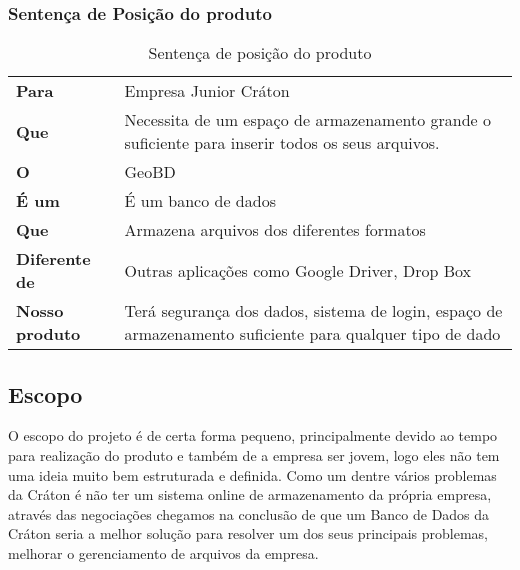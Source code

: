 \subsubsection{Sentença de Posição do produto}

  \begin{table}[!htb]
    \centering
    \begin{tabular}{p{5cm}p{8cm}} \hline
      \rowcolor{gray!50}
      \multicolumn{2}{c}{Produto}                                                                                                       \\ \hline
      \textbf{Para}           & Empresa Junior Cráton                                                                                   \\
      \textbf{Que}            & Necessita de um espaço de armazenamento grande o suficiente para inserir todos os seus arquivos.        \\
      \textbf{O}              & GeoBD                                                                                                   \\
      \textbf{É um}           & É um banco de dados                                                                                     \\
      \textbf{Que}            & Armazena arquivos dos diferentes formatos                                                               \\
      \textbf{Diferente de}   & Outras aplicações como Google Driver, Drop Box                                                          \\
      \textbf{Nosso produto}  & Terá segurança dos dados, sistema de login, espaço de armazenamento suficiente para qualquer tipo de dado
    \end{tabular}
    \caption{Sentença de posição do produto}
  \end{table}

\subsection{Escopo}

  O escopo do projeto é de certa forma pequeno, principalmente devido ao tempo para realização do produto e também de a empresa ser jovem, logo
  eles não tem uma ideia muito bem estruturada e definida. Como um dentre vários problemas da Cráton é não ter um sistema online de armazenamento
  da própria empresa, através das negociações chegamos na conclusão de que um Banco de Dados da Cráton seria a melhor solução para resolver um
  dos seus principais problemas, melhorar o gerenciamento de arquivos da empresa.

